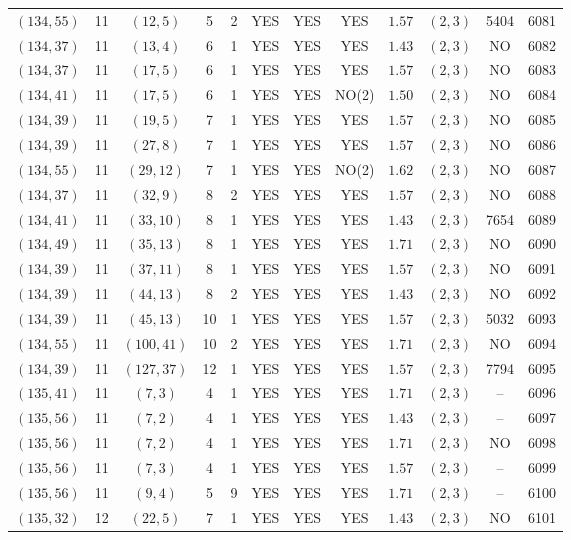 \begin{longtable}{|c|c|c|c|c|c|c|c|c|c|c|c|}
$(134,55)$ & 11 & $(12,5)$ & 5 & 2 & YES & YES & YES & $1.57$ & $(2,3)$ & 5404 & 6081\\
$(134,37)$ & 11 & $(13,4)$ & 6 & 1 & YES & YES & YES & $1.43$ & $(2,3)$ & NO & 6082\\
$(134,37)$ & 11 & $(17,5)$ & 6 & 1 & YES & YES & YES & $1.57$ & $(2,3)$ & NO & 6083\\
$(134,41)$ & 11 & $(17,5)$ & 6 & 1 & YES & YES & NO(2) & $1.50$ & $(2,3)$ & NO & 6084\\
$(134,39)$ & 11 & $(19,5)$ & 7 & 1 & YES & YES & YES & $1.57$ & $(2,3)$ & NO & 6085\\
$(134,39)$ & 11 & $(27,8)$ & 7 & 1 & YES & YES & YES & $1.57$ & $(2,3)$ & NO & 6086\\
$(134,55)$ & 11 & $(29,12)$ & 7 & 1 & YES & YES & NO(2) & $1.62$ & $(2,3)$ & NO & 6087\\
$(134,37)$ & 11 & $(32,9)$ & 8 & 2 & YES & YES & YES & $1.57$ & $(2,3)$ & NO & 6088\\
$(134,41)$ & 11 & $(33,10)$ & 8 & 1 & YES & YES & YES & $1.43$ & $(2,3)$ & 7654 & 6089\\
$(134,49)$ & 11 & $(35,13)$ & 8 & 1 & YES & YES & YES & $1.71$ & $(2,3)$ & NO & 6090\\
$(134,39)$ & 11 & $(37,11)$ & 8 & 1 & YES & YES & YES & $1.57$ & $(2,3)$ & NO & 6091\\
$(134,39)$ & 11 & $(44,13)$ & 8 & 2 & YES & YES & YES & $1.43$ & $(2,3)$ & NO & 6092\\
$(134,39)$ & 11 & $(45,13)$ & 10 & 1 & YES & YES & YES & $1.57$ & $(2,3)$ & 5032 & 6093\\
$(134,55)$ & 11 & $(100,41)$ & 10 & 2 & YES & YES & YES & $1.71$ & $(2,3)$ & NO & 6094\\
$(134,39)$ & 11 & $(127,37)$ & 12 & 1 & YES & YES & YES & $1.57$ & $(2,3)$ & 7794 & 6095\\
$(135,41)$ & 11 & $(7,3)$ & 4 & 1 & YES & YES & YES & $1.71$ & $(2,3)$ & -- & 6096\\
$(135,56)$ & 11 & $(7,2)$ & 4 & 1 & YES & YES & YES & $1.43$ & $(2,3)$ & -- & 6097\\
$(135,56)$ & 11 & $(7,2)$ & 4 & 1 & YES & YES & YES & $1.71$ & $(2,3)$ & NO & 6098\\
$(135,56)$ & 11 & $(7,3)$ & 4 & 1 & YES & YES & YES & $1.57$ & $(2,3)$ & -- & 6099\\
$(135,56)$ & 11 & $(9,4)$ & 5 & 9 & YES & YES & YES & $1.71$ & $(2,3)$ & -- & 6100\\
$(135,32)$ & 12 & $(22,5)$ & 7 & 1 & YES & YES & YES & $1.43$ & $(2,3)$ & NO & 6101\\

\end{longtable}
